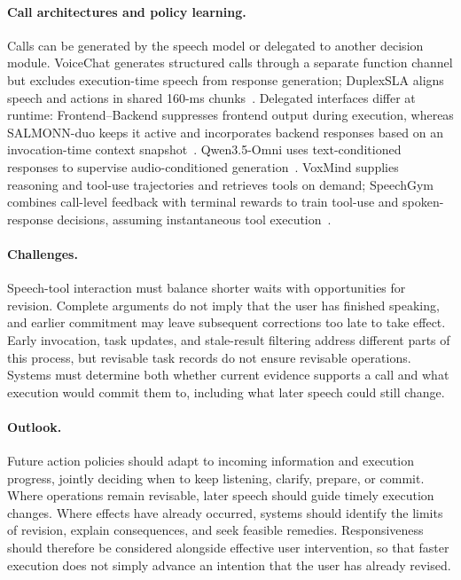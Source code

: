 \paragraph{Call architectures and policy learning.}
Calls can be generated by the speech model or delegated to another decision module. VoiceChat generates structured calls through a separate function channel but excludes execution-time speech from response generation; DuplexSLA aligns speech and actions in shared 160-ms chunks~\citep{DBLP:journals/corr/abs-2609-21967,WEB:arxiv/2605.20755}. Delegated interfaces differ at runtime: Frontend--Backend suppresses frontend output during execution, whereas SALMONN-duo keeps it active and incorporates backend responses based on an invocation-time context snapshot~\citep{DBLP:journals/corr/abs-2609-19334,DBLP:journals/corr/abs-2609-34247}. Qwen3.5-Omni uses text-conditioned responses to supervise audio-conditioned generation~\citep{DBLP:journals/corr/abs-2604-15804}. VoxMind supplies reasoning and tool-use trajectories and retrieves tools on demand; SpeechGym combines call-level feedback with terminal rewards to train tool-use and spoken-response decisions, assuming instantaneous tool execution~\citep{DBLP:conf/acl/LiangCJCJLZPLZ26,DBLP:journals/corr/abs-2608-26432}.

\paragraph{Challenges.}
Speech-tool interaction must balance shorter waits with opportunities for revision. Complete arguments do not imply that the user has finished speaking, and earlier commitment may leave subsequent corrections too late to take effect. Early invocation, task updates, and stale-result filtering address different parts of this process, but revisable task records do not ensure revisable operations. Systems must determine both whether current evidence supports a call and what execution would commit them to, including what later speech could still change.

\paragraph{Outlook.}
Future action policies should adapt to incoming information and execution progress, jointly deciding when to keep listening, clarify, prepare, or commit. Where operations remain revisable, later speech should guide timely execution changes. Where effects have already occurred, systems should identify the limits of revision, explain consequences, and seek feasible remedies. Responsiveness should therefore be considered alongside effective user intervention, so that faster execution does not simply advance an intention that the user has already revised.

